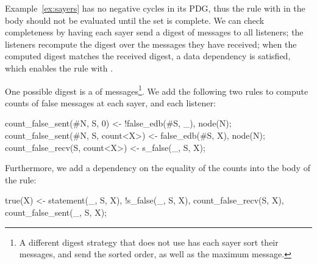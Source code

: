 
Example~\ref{ex:sayers} has no negative cycles in its PDG, thus the rule with  in the body should not be evaluated until the  set is complete.  We can check completeness by having each sayer send a digest of  messages to all listeners; the listeners recompute the digest over the  messages they have received; when the computed digest matches the received digest, a data dependency is satisfied, which enables the rule with .



One possible digest is a  of  messages\footnote{A different digest strategy that does not use  has each sayer sort their messages, and send the sorted order, as well as the maximum message.}.  We add the following two rules to compute counts of false messages at each sayer, and each listener:

\begin{Dedalus}
count_false_sent(#N, S, 0) <- 
  !false_edb(#S, _), node(N);
count_false_sent(#N, S, count<X>) <- 
  false_edb(#S, X), node(N);
count_false_recv(S, count<X>) <- s_false(_, S, X);
\end{Dedalus}

Furthermore, we add a dependency on the equality of the counts into the body of the  rule:

\begin{Dedalus}
true(X) <- statement(_, S, X), !s_false(_, S, X),
           count_false_recv(S, X),
           count_false_sent(_, S, X);
\end{Dedalus}

